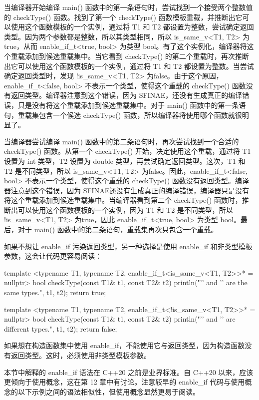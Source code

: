 当编译器开始编译 main() 函数中的第一条语句时，尝试找到一个接受两个整数值的 checkType() 函数。找到了第一个 checkType() 函数模板重载，并推断出它可以使用这个函数模板的一个实例，通过将 T1 和 T2 都设置为整数，尝试确定返回类型。因为两个参数都是整数，所以其类型相同，所以 is\_same\_v<T1, T2> 为true，从而 enable\_if\_t<true, bool> 为类型 bool。有了这个实例化，编译器将这个重载添加到候选重载集中。当它看到 checkType() 的第二个重载时，再次推断出它可以使用这个函数模板的一个实例，通过将 T1 和 T2 都设置为整数。当尝试确定返回类型时，发现 !is\_same\_v<T1, T2> 为false。由于这个原因，enable\_if\_t<false, bool> 不表示一个类型，使得这个重载的 checkType() 函数没有返回类型。编译器注意到这个错误，因为 SFINAE，还没有生成真正的编译错误，只是没有将这个重载添加到候选重载集中。对于 main() 函数中的第一条语句，重载集包含一个候选 checkType() 函数，所以编译器将使用哪个函数就很明显了。

当编译器尝试编译 main() 函数中的第二条语句时，再次尝试找到一个合适的 checkType() 函数。从第一个 checkType() 开始，决定使用这个重载，通过将 T1 设置为 int 类型，T2 设置为 double 类型，再尝试确定返回类型。这次，T1 和 T2 是不同类型，所以 is\_same\_v<T1, T2> 为false。因此，enable\_if\_t<false, bool> 不表示一个类型，使得这个重载的 checkType() 函数没有返回类型。编译器注意到这个错误，因为 SFINAE还没有生成真正的编译错误，编译器只是没有将这个重载添加到候选重载集中。当编译器看到第二个 checkType() 函数时，推断出可以使用这个函数模板的一个实例，因为 T1 和 T2 是不同类型，所以 !is\_same\_v<T1, T2> 为true，因此 enable\_if\_t<true, bool> 为类型 bool。最后，对于 main() 函数中的第二条语句，重载集再次只包含一个重载。

如果不想让 enable\_if 污染返回类型，另一种选择是使用 enable\_if 和非类型模板参数，这会让代码更容易阅读：

\begin{cpp}
template <typename T1, typename T2, enable_if_t<is_same_v<T1, T2>>* = nullptr>
bool checkType(const T1& t1, const T2& t2)
{
    println("'{}' and '{}' are the same types.", t1, t2);
    return true;
}

template <typename T1, typename T2, enable_if_t<!is_same_v<T1, T2>>* = nullptr>
bool checkType(const T1& t1, const T2& t2)
{
    println("'{}' and '{}' are different types.", t1, t2);
    return false;
}
\end{cpp}

如果想在构造函数集中使用 enable\_if，不能使用它与返回类型，因为构造函数没有返回类型。这时，必须使用非类型模板参数。

本节中解释的 enable\_if 语法在 C++20 之前是业界标准。自 C++20 以来，应该更倾向于使用概念，这在第 12 章中有讨论。注意较早的 enable\_if 代码与使用概念的以下示例之间的语法相似性，但使用概念显然更易于阅读。

